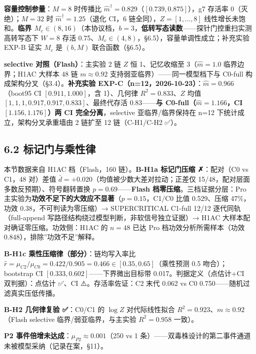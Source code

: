 \documentclass[
]{ctexart}
\begin{document}
\textbf{容量控制参量}：\(M=8\) 时传播比
\(\hat m^\dagger=0.829\)（\([0.739,0.875]\)），g7 存活率
0（灭绝）；\(M=32\) 时 \(\hat m^\dagger=1.25\)（退化 CI，6
链全同），\(Z=[1,\dots,8]\) 线性增长未饱和。\textbf{临界
\(M_c\in(8,16)\)}（本协议档，\(b=3\)，\textbf{低转写态读数}------探针门控重扫实测高转写态下
\(W{=}8\) 存活 0.75、\(M_c\in(4,8)\)，§6.5），容量单调性成立；补充实验
EXP-B 证实 \(M_c\) 是 \((b,M)\) 联合函数（§6.5）。

\textbf{selective 对照（Flash）}：主实验 2 链 \(Z\) 恒 1、记忆收缩至
3（\(\hat m=1.0\) 临界边界；H1AC 大样本 48 链 \(m\approx0.92\)
支持弱亚临界）------同一模型档下与 C0-full
构成架构分叉（§3.4）。\textbf{补充实验
EXP-C（n=12，2026-10-23）}：\(\hat m=0.966\)（boot95 CI
\([0.911,1.000]\)，含 1）、几何律 \(R^2=0.833\)、\(Z\) 均值
\([1,1,1,0.917,0.917,0.833]\)、最终代存活 0.83------\textbf{与
C0-full（\(\hat m=1.166\)，CI \([1.156,1.176]\)）两 CI
完全分离}，selective 亚临界/临界保持在 n=12 下统计成立，架构分叉承重墙由
2 链扩至 12 链（C-H1/C-H2 ✅）。

\subsection{6.2
标记门与乘性律}\label{ux6807ux8bb0ux95e8ux4e0eux4e58ux6027ux5f8b}

本节数据来自 H1AC 档（Flash，160 链）。\textbf{B-H1a 标记门压缩
✗}：配对（C0 vs C1，48 对）差值
\(\bar d=+0.020\)（均值被少数大差对拉动；正差仅
15/48，配对层面多数反预期）、符号翻转置换 \(p=0.69\)------\textbf{Flash
档零压缩}。三档证据分层：Pro
主实验为\textbf{功效不足下的大效应不显著}（\(p=0.15\)，C1/C0 比值
0.529、压缩 47\%，功效 0.38，不可判读为零压缩）→ SUPERCRITICAL C1-full
12/12 逐代同轨（full-append 写路径结构绕过模型判断，非软信号独立证据）→
H1AC 大样本配对确证零压缩。功效侧：H1AC 的 \(n=48\) 已达 Pro
档功效分析所需样本（功效 0.848），排除''功效不足''解释。

\textbf{B-H1c 乘性压缩律（部分）}：链均写入率比
\(\hat r=\mu_{C2}/\mu_{C0}=0.422/0.905=\boldsymbol{0.466}\in[0.35,0.65]\)（乘性预测
0.5 吻合）；bootstrap CI \([0.333,0.602]\)------下界微出目标带
0.017。判据定义（点估计+CI 双判据）：点估计 ✅、CI ⚠️。存活率佐证：C2
末代 0.062 vs C0 0.750------随机过滤真实压低传播。

\textbf{B-H2 几何律复验 ✅}：C0/C1 的 \(\log Z\) 对代际线性拟合
\(R^2=0.923\)、\(m\approx0.92\)（Flash selective 临界/弱亚临界，与主实验
\(R^2=0.958\) 一致）。

\textbf{P2 事件倍增未达成}：\(\mu_{P2}\approx0.001\)（250 vs 1
条）------双毒株设计的第二事件通道未被模型采纳（记录在案，§11）。
\end{document}
